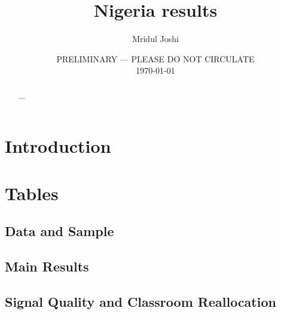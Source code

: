 \documentclass[11pt]{article}
\title{Nigeria results}
\begin{document}
\begin{titlepage}
\author{Mridul Joshi}

\date{PRELIMINARY --- PLEASE DO NOT CIRCULATE \\ \today}
\maketitle

\begin{abstract}\noindent
...

\end{abstract}
\setcounter{page}{0}
\thispagestyle{empty}
\end{titlepage}
\doublespacing

\section{Introduction}
\label{sec:intro}



\clearpage
\section*{Tables}

\subsection*{Data and Sample}





\subsection*{Main Results}






\subsection*{Signal Quality and Classroom Reallocation}



\end{document}
